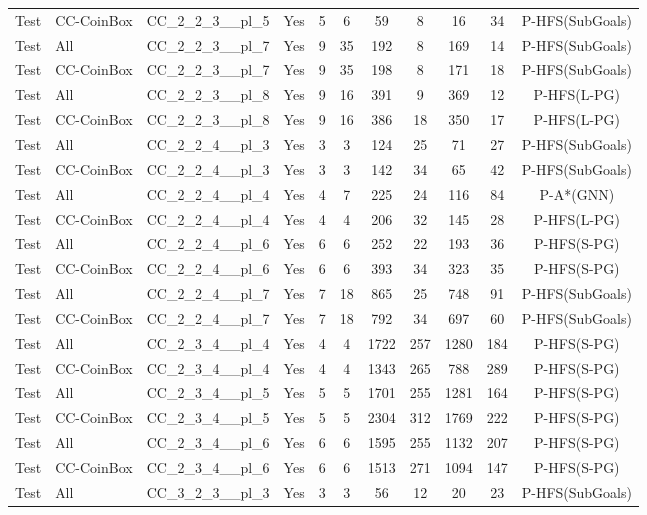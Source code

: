\documentclass{article}
\begin{document}
\begin{tabular}{lllcccccccc}
Test & CC-CoinBox & CC\_2\_2\_3\_\_pl\_5 & Yes & 5 & 6 & 59 & 8 & 16 & 34 & P-HFS(SubGoals) \\
Test & All & CC\_2\_2\_3\_\_pl\_7 & Yes & 9 & 35 & 192 & 8 & 169 & 14 & P-HFS(SubGoals) \\
Test & CC-CoinBox & CC\_2\_2\_3\_\_pl\_7 & Yes & 9 & 35 & 198 & 8 & 171 & 18 & P-HFS(SubGoals) \\
Test & All & CC\_2\_2\_3\_\_pl\_8 & Yes & 9 & 16 & 391 & 9 & 369 & 12 & P-HFS(L-PG) \\
Test & CC-CoinBox & CC\_2\_2\_3\_\_pl\_8 & Yes & 9 & 16 & 386 & 18 & 350 & 17 & P-HFS(L-PG) \\
Test & All & CC\_2\_2\_4\_\_pl\_3 & Yes & 3 & 3 & 124 & 25 & 71 & 27 & P-HFS(SubGoals) \\
Test & CC-CoinBox & CC\_2\_2\_4\_\_pl\_3 & Yes & 3 & 3 & 142 & 34 & 65 & 42 & P-HFS(SubGoals) \\
Test & All & CC\_2\_2\_4\_\_pl\_4 & Yes & 4 & 7 & 225 & 24 & 116 & 84 & P-A*(GNN) \\
Test & CC-CoinBox & CC\_2\_2\_4\_\_pl\_4 & Yes & 4 & 4 & 206 & 32 & 145 & 28 & P-HFS(L-PG) \\
Test & All & CC\_2\_2\_4\_\_pl\_6 & Yes & 6 & 6 & 252 & 22 & 193 & 36 & P-HFS(S-PG) \\
Test & CC-CoinBox & CC\_2\_2\_4\_\_pl\_6 & Yes & 6 & 6 & 393 & 34 & 323 & 35 & P-HFS(S-PG) \\
Test & All & CC\_2\_2\_4\_\_pl\_7 & Yes & 7 & 18 & 865 & 25 & 748 & 91 & P-HFS(SubGoals) \\
Test & CC-CoinBox & CC\_2\_2\_4\_\_pl\_7 & Yes & 7 & 18 & 792 & 34 & 697 & 60 & P-HFS(SubGoals) \\
Test & All & CC\_2\_3\_4\_\_pl\_4 & Yes & 4 & 4 & 1722 & 257 & 1280 & 184 & P-HFS(S-PG) \\
Test & CC-CoinBox & CC\_2\_3\_4\_\_pl\_4 & Yes & 4 & 4 & 1343 & 265 & 788 & 289 & P-HFS(S-PG) \\
Test & All & CC\_2\_3\_4\_\_pl\_5 & Yes & 5 & 5 & 1701 & 255 & 1281 & 164 & P-HFS(S-PG) \\
Test & CC-CoinBox & CC\_2\_3\_4\_\_pl\_5 & Yes & 5 & 5 & 2304 & 312 & 1769 & 222 & P-HFS(S-PG) \\
Test & All & CC\_2\_3\_4\_\_pl\_6 & Yes & 6 & 6 & 1595 & 255 & 1132 & 207 & P-HFS(S-PG) \\
Test & CC-CoinBox & CC\_2\_3\_4\_\_pl\_6 & Yes & 6 & 6 & 1513 & 271 & 1094 & 147 & P-HFS(S-PG) \\
Test & All & CC\_3\_2\_3\_\_pl\_3 & Yes & 3 & 3 & 56 & 12 & 20 & 23 & P-HFS(SubGoals) \\

\end{tabular}
\end{document}

